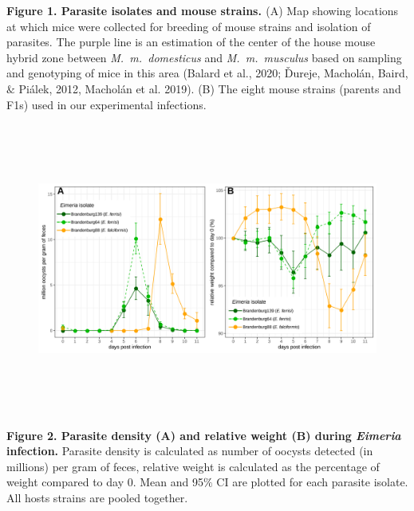 \documentclass[12pt]{article}
\renewcommand{\_}{\kern-1.5pt\textunderscore\kern-1.5pt}
\begin{document}
{\fontsize{10pt}{12.0pt}\selectfont \textbf{\textcolor[HTML]{CE181E}{Figure 1. Parasite isolates and mouse strains. }}(A)\textbf{ }Map showing locations at which mice were collected for breeding of mouse strains and isolation of parasites. The purple line is an estimation of the center of the house mouse hybrid zone between \textit{M. m. domesticus} and \textit{M. m. musculus} based on sampling and genotyping of mice in this area (Balard et al., 2020; Ďureje, Macholán, Baird, $\&$  Piálek, 2012, Macholán et al. 2019). \textcolor[HTML]{CE181E}{(B) The eight mouse strains (parents and F1s) used in our experimental infections.}\par}


\newpage
\par




\begin{figure}[H]
	\begin{Center}
		\includegraphics[width=7.52in,height=3.78in]{./media/image4.png}
	\end{Center}
\end{figure}



{\fontsize{10pt}{12.0pt}\selectfont \textbf{Figure 2. Parasite density (A) and relative weight (B) during \textit{Eimeria }infection. }Parasite density is calculated as number of oocysts detected (in millions) per gram of feces, relative weight is calculated as the percentage of weight compared to day 0.\textbf{ }Mean and 95$\%$  CI are plotted for each parasite isolate. All hosts strains are pooled together.\par}
\end{document}

